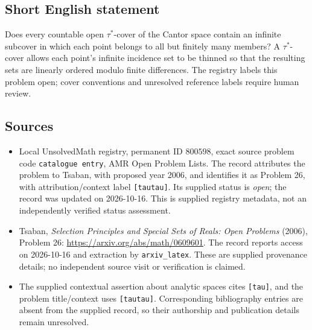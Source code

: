 \documentclass[11pt]{article}
\begin{document}
\subsection{Short English statement}
Does every countable open \(\tau^*\)-cover of the Cantor space contain an infinite subcover in which each point belongs to all but finitely many members? A \(\tau^*\)-cover allows each point's infinite incidence set to be thinned so that the resulting sets are linearly ordered modulo finite differences. The registry labels this problem open; cover conventions and unresolved reference labels require human review.
\subsection{Sources}
\begin{itemize}
\item Local UnsolvedMath registry, permanent ID \(800598\), exact source problem code \texttt{catalogue entry}, AMR Open Problem Lists. The record attributes the problem to Tsaban, with proposed year 2006, and identifies it as Problem 26, with attribution/context label \texttt{[tautau]}. Its supplied status is \emph{open}; the record was updated on 2026-10-16. This is supplied registry metadata, not an independently verified status assessment.
\item Tsaban, \emph{Selection Principles and Special Sets of Reals: Open Problems} (2006), Problem 26: \url{https://arxiv.org/abs/math/0609601}. The record reports access on 2026-10-16 and extraction by \texttt{arxiv\_latex}. These are supplied provenance details; no independent source visit or verification is claimed.
\item The supplied contextual assertion about analytic spaces cites \texttt{[tau]}, and the problem title/context uses \texttt{[tautau]}. Corresponding bibliography entries are absent from the supplied record, so their authorship and publication details remain unresolved.
\end{itemize}
\end{document}
